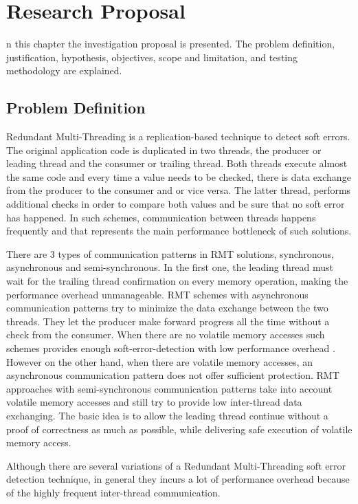 %
%
\let\textcircled=\pgftextcircled
\chapter{Research Proposal}
\label{chap:RelatedWork}
n this chapter the investigation proposal is presented. The problem definition, justification, hypothesis, objectives, scope and limitation, and testing methodology are explained. 

\section{Problem Definition}
\label{sec:problemDefinition}
Redundant Multi-Threading is a replication-based technique to detect soft errors. The original application code is duplicated in two threads, the producer or leading thread and the consumer or trailing thread. Both threads execute almost the same code and every time a value needs to be checked, there is data exchange from the producer to the consumer and or vice versa. The latter thread, performs additional checks in order to compare both values and be sure that no soft error has happened. In such schemes, communication between threads happens frequently and that represents the main performance bottleneck of such solutions.

There are 3 types of communication patterns in RMT solutions, synchronous, asynchronous and semi-synchronous. In the first one, the leading thread must wait for the trailing thread confirmation on every memory operation, making the performance overhead unmanageable. RMT schemes with asynchronous communication patterns try to minimize the data exchange between the two threads. They let the producer make forward progress all the time without a check from the consumer. When there are no volatile memory accesses such schemes provides enough soft-error-detection with low performance overhead \cite{mitropoulou2016comet}. However on the other hand, when there are volatile memory accesses, an asynchronous communication pattern does not offer sufficient protection. RMT approaches with semi-synchronous communication patterns take into account volatile memory accesses and still try to provide low inter-thread data exchanging. The basic idea is to allow the leading thread continue without a proof of correctness as much as possible, while delivering safe execution of volatile memory access. 

Although there are several variations of a Redundant Multi-Threading soft error detection technique, in general they incurs a lot of performance overhead because of the highly frequent inter-thread communication. 

